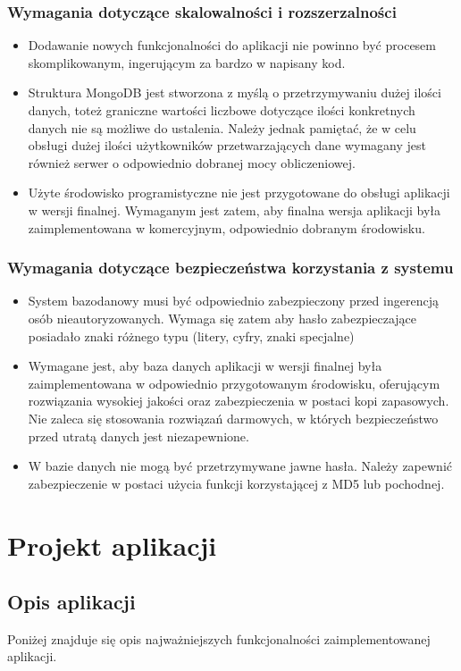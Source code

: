 \documentclass[eng,printmode]{mgr}
\begin{document}
\subsection{Wymagania dotyczące skalowalności i rozszerzalności}
\begin{itemize}
  \item Dodawanie nowych funkcjonalności do aplikacji nie powinno być procesem skomplikowanym, ingerującym za bardzo w napisany kod.
  \item Struktura MongoDB jest stworzona z myślą o przetrzymywaniu dużej ilości danych, toteż graniczne wartości liczbowe dotyczące ilości konkretnych danych nie są możliwe do ustalenia. Należy jednak pamiętać, że w celu obsługi dużej ilości użytkowników przetwarzających dane wymagany jest również serwer o odpowiednio dobranej mocy obliczeniowej.
  \item Użyte środowisko programistyczne nie jest przygotowane do obsługi aplikacji w wersji finalnej. Wymaganym jest zatem, aby finalna wersja aplikacji była zaimplementowana w komercyjnym, odpowiednio dobranym środowisku.
\end{itemize}
\subsection{Wymagania dotyczące bezpieczeństwa korzystania z systemu}
\begin{itemize}
  \item System bazodanowy musi być odpowiednio zabezpieczony przed ingerencją osób nieautoryzowanych. Wymaga się zatem aby hasło zabezpieczające posiadało znaki różnego typu (litery, cyfry, znaki specjalne)
  \item Wymagane jest, aby baza danych aplikacji w wersji finalnej była zaimplementowana w odpowiednio przygotowanym środowisku, oferującym rozwiązania wysokiej jakości oraz zabezpieczenia w postaci kopi zapasowych. Nie zaleca się stosowania rozwiązań darmowych, w których bezpieczeństwo przed utratą danych jest niezapewnione.
  \item W bazie danych nie mogą być przetrzymywane jawne hasła. Należy zapewnić zabezpieczenie w postaci użycia funkcji korzystającej z MD5\cite{MD5} lub pochodnej.
\end{itemize}
\chapter{Projekt aplikacji}
\section{Opis aplikacji}
Poniżej znajduje się opis najważniejszych funkcjonalności zaimplementowanej aplikacji.
\end{document}
